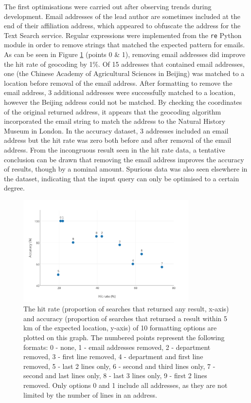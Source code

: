 \documentclass[Report.tex]{subfiles}
\begin{document}
\noindent The first optimisations were carried out after observing trends during development. Email addresses of the lead author are sometimes included at the end of their affiliation address, which appeared to obfuscate the address for the Text Search service. Regular expressions were implemented from the \texttt{re} Python module in order to remove strings that matched the expected pattern for emails. As can be seen in Figure \ref{fig:geoscatter} (points 0 \& 1), removing email addresses did improve the hit rate of geocoding by 1\%. Of 15 addresses that contained email addresses, one (the Chinese Academy of Agricultural Sciences in Beijing) was matched to a location before removal of the email address. After formatting to remove the email address, 3 additional addresses were successfully matched to a location, however the Beijing address could not be matched. By checking the coordinates of the original returned address, it appears that the geocoding algorithm incorporated the email string to match the address to the Natural History Museum in London. In the accuracy dataset, 3 addresses included an email address but the hit rate was zero both before and after removal of the email address. From the incongruous result seen in the hit rate data, a tentative conclusion can be drawn that removing the email address improves the accuracy of results, though by a nominal amount. Spurious data was also seen elsewhere in the dataset, indicating that the input query can only be optimised to a certain degree.

\begin{figure}[!ht]
\begin{center}
	\includegraphics[width=0.8\textwidth]{../lib/images/geocode_performance_scatter}
	\caption{The hit rate (proportion of searches that returned any result, x-axis) and accuracy (proportion of searches that returned a result within 5 km of the expected location, y-axis) of 10 formatting options are plotted on this graph. The numbered points represent the following formats: 0 - none, 1 - email addresses removed, 2 - department removed, 3 - first line removed, 4 - department and first line removed, 5 - last 2 lines only, 6 - second and third lines only, 7 - second and last lines only, 8 - last 3 lines only, 9 - first 2 lines removed. Only options 0 and 1 include all addresses, as they are not limited by the number of lines in an address. \label{fig:geoscatter}}
\end{center}
\end{figure}
\newpage
\end{document}
